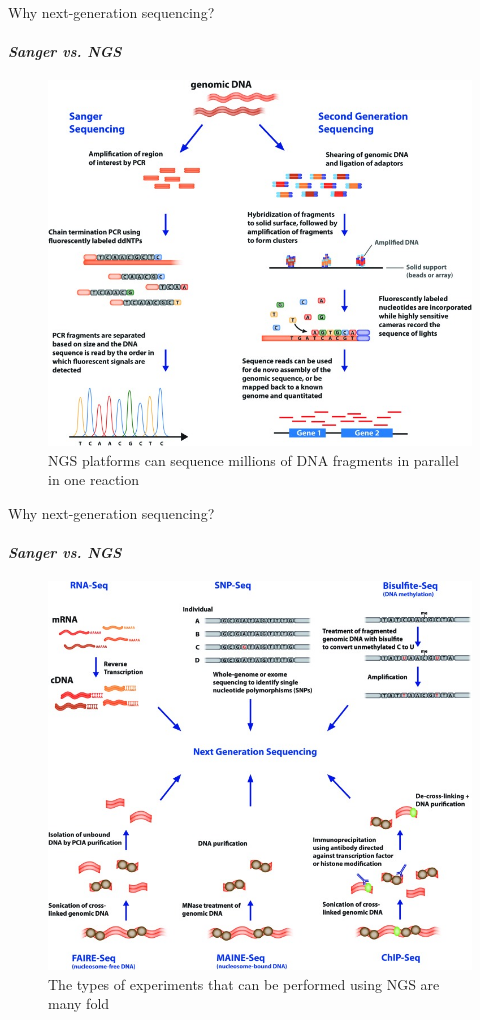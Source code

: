 \documentclass{if-beamer}
\begin{document}
\begin{frame}{Why next-generation sequencing?}
\framesubtitle{\emph{Sanger vs. NGS}}
\begin{figure}
\centering
\includegraphics[scale=2.25]{comparison_sanger_ngs.jpg}
\caption{NGS platforms can sequence millions of DNA fragments in parallel in one reaction}
\end{figure}
\end{frame}
\begin{frame}{Why next-generation sequencing?}
\framesubtitle{\emph{Sanger vs. NGS}}
\begin{figure}
\centering
\includegraphics[scale=2.25]{applications_of_ngs.jpg}
\caption{The types of experiments that can be performed using NGS are many fold}
\end{figure}
\end{frame}
\end{document}
